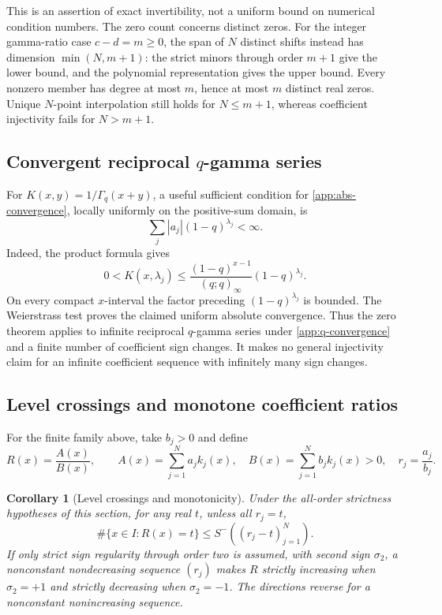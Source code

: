 \documentclass[11pt,a4paper]{article}
\newtheorem{corollary}[theorem]{Corollary}
\theoremstyle{definition}
\theoremstyle{remark}
\begin{document}
This is an assertion of exact invertibility, not a uniform bound on
numerical condition numbers. The zero count concerns distinct zeros.
For the integer gamma-ratio case \(c-d=m\ge0\), the span of \(N\)
distinct shifts instead has dimension \(\min(N,m+1)\): the strict
minors through order \(m+1\) give the lower bound, and the polynomial
representation gives the upper bound. Every nonzero member has degree
at most \(m\), hence at most \(m\) distinct real zeros. Unique
\(N\)-point interpolation still holds for \(N\le m+1\), whereas
coefficient injectivity fails for \(N>m+1\).

\subsection{Convergent reciprocal \texorpdfstring{$q$}{q}-gamma series}

For \(K(x,y)=1/\Gamma_q(x+y)\), a useful sufficient condition for
\eqref{app:abs-convergence}, locally uniformly on the positive-sum
domain, is
\begin{equation}\label{app:q-convergence}
 \sum_j |a_j|(1-q)^{\lambda_j}<\infty.
\end{equation}
Indeed, the product formula gives
\[
 0<K(x,\lambda_j)
 \le\frac{(1-q)^{x-1}}{(q;q)_\infty}(1-q)^{\lambda_j}.
\]
On every compact \(x\)-interval the factor preceding
\((1-q)^{\lambda_j}\) is bounded. The Weierstrass test proves the
claimed uniform absolute convergence. Thus the zero theorem applies
to infinite reciprocal \(q\)-gamma series under
\eqref{app:q-convergence} and a finite number of coefficient sign
changes. It makes no general injectivity claim for an infinite
coefficient sequence with infinitely many sign changes.

\subsection{Level crossings and monotone coefficient ratios}

For the finite family above, take \(b_j>0\) and define
\begin{equation}\label{eq:ratio}
 R(x)=\frac{A(x)}{B(x)},\qquad
 A(x)=\sum_{j=1}^N a_jk_j(x),\quad
 B(x)=\sum_{j=1}^N b_jk_j(x)>0,\quad
 r_j=\frac{a_j}{b_j}.
\end{equation}

\begin{corollary}[Level crossings and monotonicity]\label{cor:ratios}
Under the all-order strictness hypotheses of this section, for any
real \(t\), unless all \(r_j=t\),
\begin{equation}\label{app:level-bound}
 \#\{x\in I:R(x)=t\}\le S^-((r_j-t)_{j=1}^N).
\end{equation}
If only strict sign regularity through order two is assumed, with
second sign \(\sigma_2\), a nonconstant nondecreasing sequence
\((r_j)\) makes \(R\) strictly increasing when \(\sigma_2=+1\)
and strictly decreasing when \(\sigma_2=-1\). The directions reverse
for a nonconstant nonincreasing sequence.
\end{corollary}
\end{document}
